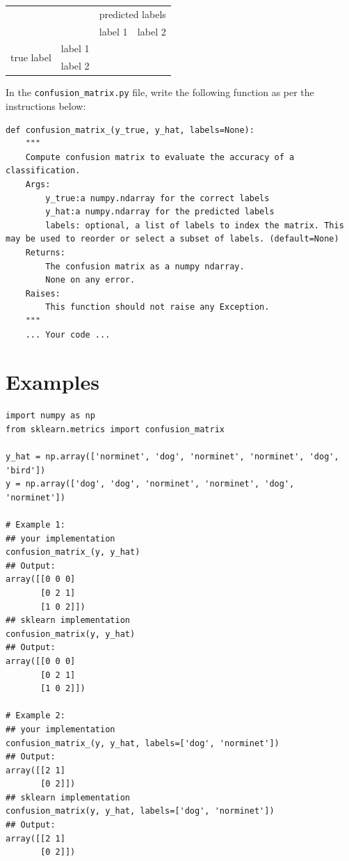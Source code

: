 \documentclass{42-en}
\begin{document}
\begin{center}
  \begin{tabular}{|c|c|c|c|}
    \cline{3-4}
    \multicolumn{2}{c|}{\multirow{2}{*}{}}  & \multicolumn{2}{|c|}{predicted labels} \\ \cline{3-4}
    \multicolumn{2}{c|}{}       & label 1 & label 2 \\
    \hline
    \multirow{2}{*}{true label} & label 1 &         &         \\
    \cline{2-4}
                                & label 2 &         &         \\
    \hline
  \end{tabular}
\end{center}

In the \texttt{confusion\_matrix.py} file, write the following function as per the instructions below:

\begin{verbatim}
def confusion_matrix_(y_true, y_hat, labels=None):
    """
    Compute confusion matrix to evaluate the accuracy of a classification.
    Args:
        y_true:a numpy.ndarray for the correct labels
        y_hat:a numpy.ndarray for the predicted labels
        labels: optional, a list of labels to index the matrix. This may be used to reorder or select a subset of labels. (default=None)
    Returns: 
        The confusion matrix as a numpy ndarray.
        None on any error.
    Raises:
        This function should not raise any Exception.
    """
    ... Your code ...
\end{verbatim}


\section*{Examples}
\begin{verbatim}
import numpy as np
from sklearn.metrics import confusion_matrix

y_hat = np.array(['norminet', 'dog', 'norminet', 'norminet', 'dog', 'bird'])
y = np.array(['dog', 'dog', 'norminet', 'norminet', 'dog', 'norminet'])

# Example 1: 
## your implementation
confusion_matrix_(y, y_hat)
## Output:
array([[0 0 0]
       [0 2 1]
       [1 0 2]])
## sklearn implementation
confusion_matrix(y, y_hat)
## Output:
array([[0 0 0]
       [0 2 1]
       [1 0 2]])

# Example 2:
## your implementation
confusion_matrix_(y, y_hat, labels=['dog', 'norminet'])
## Output:
array([[2 1]
       [0 2]])
## sklearn implementation
confusion_matrix(y, y_hat, labels=['dog', 'norminet'])
## Output:
array([[2 1]
       [0 2]])
\end{verbatim}
\end{document}
